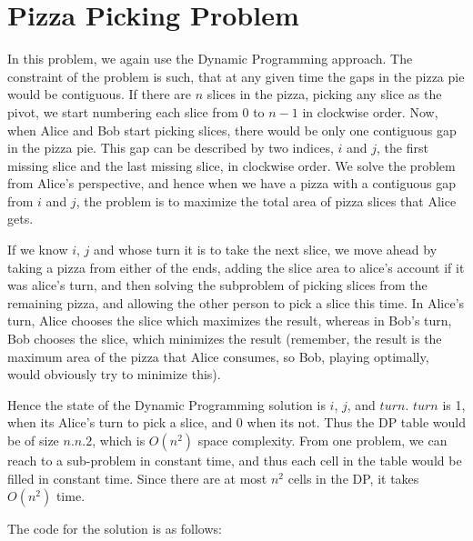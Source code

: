 \documentclass{article}
\begin{document}
\section{Pizza Picking Problem}
In this problem, we again use the Dynamic Programming approach. The constraint of the problem is such, that at any given time the gaps in the pizza pie would be contiguous. If there are $n$ slices in the pizza, picking any slice as the pivot, we start numbering each slice from $0$ to $n-1$ in clockwise order. Now, when Alice and Bob start picking slices, there would be only one contiguous gap in the pizza pie. This gap can be described by two indices, $i$ and $j$, the first missing slice and the last missing slice, in clockwise order. We solve the problem from Alice's perspective, and hence when we have a pizza with a contiguous gap from $i$ and $j$, the problem is to maximize the total area of pizza slices that Alice gets.

If we know $i$, $j$ and whose turn it is to take the next slice, we move ahead by taking a pizza from either of the ends, adding the slice area to alice's account if it was alice's turn, and then solving the subproblem of picking slices from the remaining pizza, and allowing the other person to pick a slice this time. In Alice's turn, Alice chooses the slice which maximizes the result, whereas in Bob's turn, Bob chooses the slice, which minimizes the result (remember, the result is the maximum area of the pizza that Alice consumes, so Bob, playing optimally, would obviously try to minimize this). 

Hence the state of the Dynamic Programming solution is $i$, $j$, and $turn$. $turn$ is 1, when its Alice's turn to pick a slice, and 0 when its not. Thus the DP table would be of size $n.n.2$, which is $O(n^2)$ space complexity. From one problem, we can reach to a sub-problem in constant time, and thus each cell in the table would be filled in constant time. Since there are at most $n^2$ cells in the DP, it takes $O(n^2)$ time.

The code for the solution is as follows:

\end{document}
